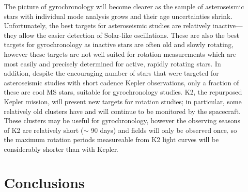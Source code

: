 \documentclass[10pt,preprint]{aastex}
\begin{document}
The picture of gyrochronology will become clearer as the sample of asteroseismic stars with individual mode analysis grows and their age uncertainties shrink.
Unfortunately, the best targets for asteroseismic studies are relatively inactive---they allow the easier detection of Solar-like oscillations.
These are also the best targets for gyrochronology as inactive stars are often old and slowly rotating, however these targets are not well suited for rotation measurements which are most easily and precisely determined for active, rapidly rotating stars.
In addition, despite the encouraging number of stars that were targeted for asteroseismic studies with short cadence Kepler observations, only a fraction of these are cool MS stars, suitable for gyrochronology studies.
K2, the repurposed Kepler mission, will present new targets for rotation studies; in particular, some relatively old clusters have and will continue to be monitored by the spacecraft.
These clusters may be useful for gyrochronology, however the observing seasons of K2 are relatively short ($\sim$ 90 days) and fields will only be observed once, so the maximum rotation periods measureable from K2 light curves will be considerably shorter than with Kepler.

\section{Conclusions}
\label{sec:conclusions}
\end{document}
